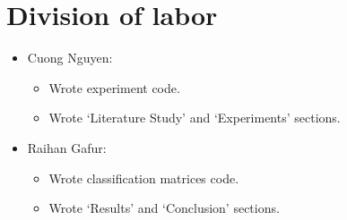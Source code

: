 \section{Division of labor}
\begin{itemize}
    \item Cuong Nguyen:
        \begin{itemize}
            \item Wrote experiment code.
            \item Wrote `Literature Study' and `Experiments' sections.
        \end{itemize}
    \item Raihan Gafur:
        \begin{itemize}
            \item Wrote classification matrices code.
            \item Wrote `Results' and `Conclusion' sections.
        \end{itemize}
\end{itemize}
